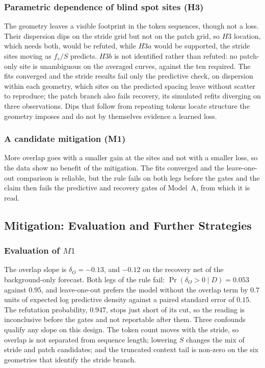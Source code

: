 \subsubsection*{Parametric dependence of blind spot sites (H3)}
The geometry leaves a visible footprint in the token sequences, though not a loss. Their dispersion dips on the stride grid but not on the patch grid, so $H3$ location, which needs both, would be refuted, while $H3a$ would be supported, the stride sites moving as $f_s/S$ predicts. $H3b$ is not identified rather than refuted: no patch-only site is unambiguous on the averaged curves, against the ten required. The fits converged and the stride results fail only the predictive check, on dispersion within each geometry, which sites on the predicted spacing leave without scatter to reproduce; the patch branch also fails recovery, its simulated refits diverging on three observations. Dips that follow from repeating tokens locate structure the geometry imposes and do not by themselves evidence a learned loss.

\subsubsection*{A candidate mitigation (M1)}
More overlap goes with a smaller gain at the sites and not with a smaller loss, so the data show no benefit of the mitigation. The fits converged and the leave-one-out comparison is reliable, but the rule fails on both legs before the gates and the claim then fails the predictive and recovery gates of Model~A, from which it is read.

\subsection{Mitigation: Evaluation and Further Strategies}\label{sec:mitigationDiscussion}
\begingroup
\let\subsection\subsubsection%
\subsection*{Evaluation of $M1$}

The overlap slope is $\delta_O=-0.13$, and $-0.12$ on the recovery net of the background-only forecast. Both legs of the rule fail: $\Pr(\delta_O>0\mid D)=0.053$ against $0.95$, and leave-one-out prefers the model without the overlap term by $0.7$ units of expected log predictive density against a paired standard error of $0.15$. The refutation probability, $0.947$, stops just short of its cut, so the reading is inconclusive before the gates and not reportable after them. Three confounds qualify any slope on this design. The token count moves with the stride, so overlap is not separated from sequence length; lowering $S$ changes the mix of stride and patch candidates; and the truncated context tail is non-zero on the six geometries that identify the stride branch.

